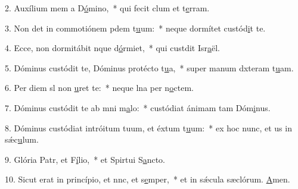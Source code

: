 2. Auxílium mem a D\uline{ó}mino,~* qui fecit clum et t\uline{e}rram.\par 
3. Non det in commotiónem pdem t\uline{u}um:~* neque dormítet  custód\uline{i}t te.\par 
4. Ecce, non dormitábit nque d\uline{ó}rmiet,~* qui custdit Isr\uline{a}ël.\par 
5. Dóminus custódit te, Dóminus protécto t\uline{u}a,~* super manum dxteram t\uline{u}am.\par 
6. Per diem sl non \uline{u}ret te:~* neque lna per n\uline{o}ctem.\par 
7. Dóminus custódit te ab mni m\uline{a}lo:~* custódiat ánimam tam Dóm\uline{i}nus.\par 
8. Dóminus custódiat intróitum tuum, et éxtum t\uline{u}um:~* ex hoc nunc, et us in sǽc\uline{u}lum.\par 
9. Glória Patr, et F\uline{í}lio,~* et Spirtui S\uline{a}ncto.\par 
10. Sicut erat in princípio, et nnc, et s\uline{e}mper,~* et in sǽcula sæclórum. \uline{A}men.\par 
